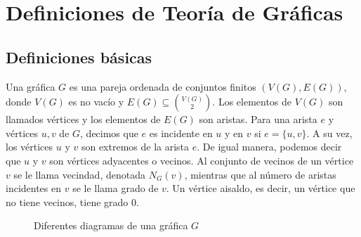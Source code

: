 \chapter{Definiciones de Teor\'ia de Gr\'aficas}%
\label{cap:defs grafs}

\section{Definiciones b\'asicas}%
\label{sec:def-basicas}

Una gr\'afica $G$ es una pareja ordenada de conjuntos finitos $(V(G), E(G))$,
donde $V(G)$ es no vac\'io y $E(G) \subseteq \binom{V(G)}{2}$. Los elementos de
$V(G)$ son llamados v\'ertices y los elementos de $E(G)$ son aristas. Para una
arista $e$ y v\'ertices $u, v$ de $G$, decimos que $e$ es incidente en $u$ y en
$v$ si $e= \{u, v\}$. A su vez, los v\'ertices $u$ y $v$ son extremos de la
arista $e$. De igual manera, podemos decir que $u$ y $v$ son v\'ertices
adyacentes o vecinos. Al conjunto de vecinos de un v\'ertice $v$ se le llama
vecindad, denotada $N_G(v)$, mientras que al n\'umero de aristas incidentes en
$v$ se le llama grado de $v$. Un v\'ertice aisaldo, es decir, un v\'ertice que
no tiene vecinos, tiene grado $0$.

\begin{figure}[ht!]
    \centering
    \caption{Diferentes diagramas de una gr\'afica $G$}
    \label{fig:diagGraf}
\end{figure}

